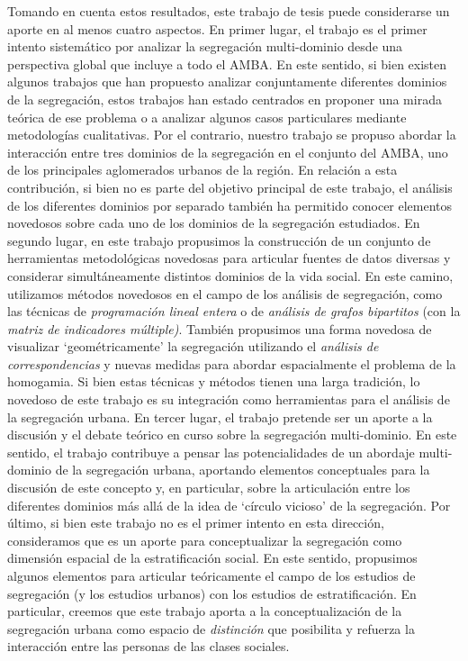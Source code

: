 \documentclass[
  spanish,
  a4paper,%
  chapterprefix=true,%
  DIV=calc,%
  twoside]{scrbook}%
\begin{document}
Tomando en cuenta estos resultados, este trabajo de tesis puede
considerarse un aporte en al menos cuatro aspectos.
En primer lugar, el trabajo
es el primer intento sistemático por analizar la segregación
multi-dominio desde una perspectiva global que incluye a todo el AMBA.
En este sentido, si bien existen algunos trabajos que han propuesto
analizar conjuntamente diferentes dominios de la segregación, estos
trabajos han estado centrados en proponer una mirada teórica de ese
problema o a analizar algunos casos particulares mediante metodologías
cualitativas. Por el contrario, nuestro trabajo se propuso abordar la
interacción entre tres dominios de la segregación en el conjunto del
AMBA, uno de los principales aglomerados urbanos de la región. En
relación a esta contribución, si bien no es parte del objetivo principal
de este trabajo, el análisis de los diferentes dominios por separado
también ha permitido conocer elementos novedosos sobre cada uno de los
dominios de la segregación estudiados. En
segundo lugar, en este trabajo propusimos la construcción de un conjunto
de herramientas metodológicas novedosas para articular fuentes de datos
diversas y considerar simultáneamente distintos dominios de la vida
social. En este camino, utilizamos métodos novedosos en el campo de los
análisis de segregación, como las técnicas de \emph{programación lineal
entera} o de \emph{análisis de grafos bipartitos} (con la \emph{matriz de
indicadores múltiple)}. También propusimos una forma novedosa de
visualizar `geométricamente' la segregación utilizando el \emph{análisis de
correspondencias} y nuevas medidas para abordar espacialmente el
problema de la homogamia. Si bien estas técnicas y métodos tienen una
larga tradición, lo novedoso de este trabajo es su integración como
herramientas para el análisis de la segregación urbana.
En tercer
lugar, el trabajo pretende ser un aporte a la discusión y el debate
teórico en curso sobre la segregación multi-dominio. En este sentido, el
trabajo contribuye a pensar las potencialidades de un abordaje
multi-dominio de la segregación urbana, aportando elementos conceptuales
para la discusión de este concepto y, en particular, sobre la
articulación entre los diferentes dominios más allá de la idea de
`círculo vicioso' de la segregación.
Por
último, si bien este trabajo no es el primer intento en esta dirección,
consideramos que es un aporte para conceptualizar la segregación como
dimensión espacial de la estratificación social. En este sentido,
propusimos algunos elementos para articular teóricamente el campo de los
estudios de segregación (y los estudios urbanos) con los estudios de
estratificación. En particular, creemos que este trabajo aporta a la
conceptualización de la segregación urbana como espacio de \emph{distinción}
que posibilita y refuerza la interacción entre las personas de las
clases sociales.
\end{document}
